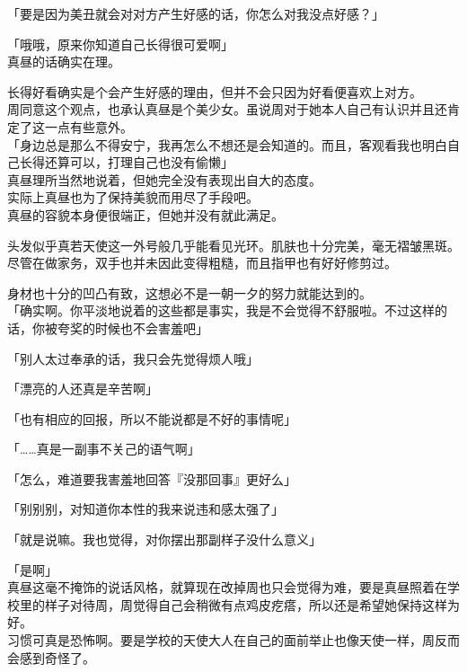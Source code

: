 「要是因为美丑就会对对方产生好感的话，你怎么对我没点好感？」

「哦哦，原来你知道自己长得很可爱啊」\\

真昼的话确实在理。

长得好看确实是个会产生好感的理由，但并不会只因为好看便喜欢上对方。\\

周同意这个观点，也承认真昼是个美少女。虽说周对于她本人自己有认识并且还肯定了这一点有些意外。\\

「身边总是那么不得安宁，我再怎么不想还是会知道的。而且，客观看我也明白自己长得还算可以，打理自己也没有偷懒」\\

真昼理所当然地说着，但她完全没有表现出自大的态度。\\

实际上真昼也为了保持美貌而用尽了手段吧。\\

真昼的容貌本身便很端正，但她并没有就此满足。

头发似乎真若天使这一外号般几乎能看见光环。肌肤也十分完美，毫无褶皱黑斑。尽管在做家务，双手也并未因此变得粗糙，而且指甲也有好好修剪过。

身材也十分的凹凸有致，这想必不是一朝一夕的努力就能达到的。\\

「确实啊。你平淡地说着的这些都是事实，我是不会觉得不舒服啦。不过这样的话，你被夸奖的时候也不会害羞吧」

「别人太过奉承的话，我只会先觉得烦人哦」

「漂亮的人还真是辛苦啊」

「也有相应的回报，所以不能说都是不好的事情呢」

「……真是一副事不关己的语气啊」

「怎么，难道要我害羞地回答『没那回事』更好么」

「别别别，对知道你本性的我来说违和感太强了」

「就是说嘛。我也觉得，对你摆出那副样子没什么意义」

「是啊」\\

真昼这毫不掩饰的说话风格，就算现在改掉周也只会觉得为难，要是真昼照着在学校里的样子对待周，周觉得自己会稍微有点鸡皮疙瘩，所以还是希望她保持这样为好。\\

习惯可真是恐怖啊。要是学校的天使大人在自己的面前举止也像天使一样，周反而会感到奇怪了。

